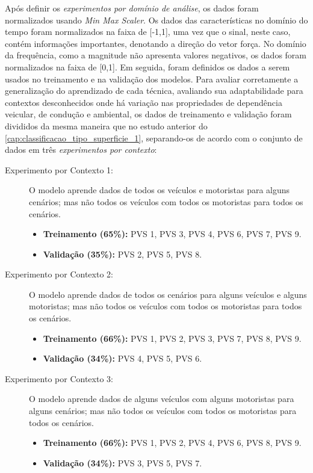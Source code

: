 Após definir os \emph{experimentos por domínio de análise}, os dados foram normalizados usando \textit{Min Max Scaler}. Os dados das características no domínio do tempo foram normalizados na faixa de [-1,1], uma vez que o sinal, neste caso, contém informações importantes, denotando a direção do vetor força. No domínio da frequência, como a magnitude não apresenta valores negativos, os dados foram normalizados na faixa de [0,1]. Em seguida, foram definidos os dados a serem usados no treinamento e na validação dos modelos. Para avaliar corretamente a generalização do aprendizado de cada técnica, avaliando sua adaptabilidade para contextos desconhecidos onde há variação nas propriedades de dependência veicular, de condução e ambiental, os dados de treinamento e validação foram divididos da mesma maneira que no estudo anterior do \autoref{cap:classificacao_tipo_superficie_1}, separando-os de acordo com o conjunto de dados em três \emph{experimentos por contexto}:

\begin{description}
	
	\item[Experimento por Contexto 1:] O modelo aprende dados de todos os veículos e motoristas para alguns cenários; mas não todos os veículos com todos os motoristas para todos os cenários.
    \begin{itemize}
        \item \textbf{Treinamento (65\%):} PVS 1, PVS 3, PVS 4, PVS 6, PVS 7, PVS 9. 
        \item \textbf{Validação (35\%):} PVS 2, PVS 5, PVS 8.
    \end{itemize}
    
    \item[Experimento por Contexto 2:] O modelo aprende dados de todos os cenários para alguns veículos e alguns motoristas; mas não todos os veículos com todos os motoristas para todos os cenários.
    \begin{itemize}
        \item \textbf{Treinamento (66\%):} PVS 1, PVS 2, PVS 3, PVS 7, PVS 8, PVS 9.
        \item \textbf{Validação (34\%):} PVS 4, PVS 5, PVS 6.
    \end{itemize}
    
    \item[Experimento por Contexto 3:] O modelo aprende dados de alguns veículos com alguns motoristas para alguns cenários; mas não todos os veículos com todos os motoristas para todos os cenários.
    \begin{itemize}
        \item \textbf{Treinamento (66\%):} PVS 1, PVS 2, PVS 4, PVS 6, PVS 8, PVS 9.
        \item \textbf{Validação (34\%):} PVS 3, PVS 5, PVS 7.
    \end{itemize}
    
\end{description}

